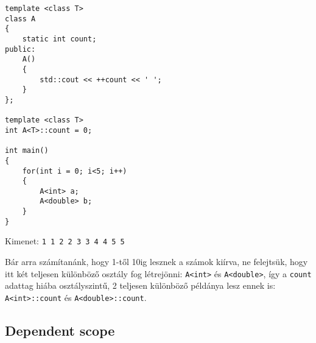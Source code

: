 \documentclass[a4paper,11.5pt,table]{article}
\begin{document}
	\begin{lstlisting}
template <class T>
class A
{
	static int count;
public:
	A()
	{
		std::cout << ++count << ' ';
	}
};

template <class T>
int A<T>::count = 0;

int main() 
{
	for(int i = 0; i<5; i++)
	{
		A<int> a;
		A<double> b;
	}
}
	\end{lstlisting}
	Kimenet: \texttt{1 1 2 2 3 3 4 4 5 5}
	
	Bár arra számítanánk, hogy 1-től 10ig lesznek a számok kiírva, ne felejtsük, hogy itt két teljesen különböző osztály fog létrejönni: \texttt{A<int>} és \texttt{A<double>}, így a \texttt{count} adattag hiába osztályszintű, 2 teljesen különböző példánya lesz ennek is: \texttt{A<int>::count} és \texttt{A<double>::count}.
	
	\subsection{Dependent scope}
	
\end{document}
